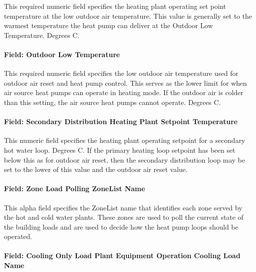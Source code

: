 This required numeric field specifies the heating plant operating set point temperature at the low outdoor air temperature. This value is generally set to the warmest temperature the heat pump can deliver at the Outdoor Low Temperature.  Degrees C.

\paragraph{Field: Outdoor Low Temperature}\label{field-hot-water-setpoint-reset-ratio-plantequipmentoperationchillerheaterchangeover}

This required numeric field specifies the low outdoor air temperature used for outdoor air reset and heat pump control.  This serves as the lower limit for when air source heat pumps can operate in heating mode.  If the outdoor air is colder than this setting, the air source heat pumps cannot operate.  Degrees C.

\paragraph{Field: Secondary Distribution Heating Plant Setpoint Temperature}\label{secondary-distribution-heating-plant-setpoint-temperature}

This numeric field specifies the heating plant operating setpoint for a secondary hot water loop.  Degrees C.  If the primary heating loop setpoint has been set below this as for outdoor air reset, then the secondary distribution loop may be set to the lower of this value and the outdoor air reset value. 

\paragraph{Field: Zone Load Polling ZoneList Name}\label{field-zone-load-polling-zonelist-name-plantequipmentoperationchillerheaterchangeover}

This alpha field specifies the ZoneList name that identifies each zone served by the hot and cold water plants. These zones are used to poll the current state of the building loads and are used to decide how the heat pump loops should be operated. 

\paragraph{Field: Cooling Only Load Plant Equipment Operation Cooling Load Name}\label{field-cool-only-load-equip-operation-name-plantequipmentoperationchillerheaterchangeover}

